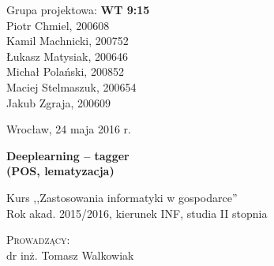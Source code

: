 \noindent
\begin{minipage}[t]{.5\linewidth}
	\begin{flushleft}
		Grupa projektowa: \textbf{WT 9:15}\\
		\vspace{0.8cm}
		Piotr Chmiel, 200608\\
		Kamil Machnicki, 200752\\
		Łukasz Matysiak, 200646\\
		Michał Polański, 200852\\
		Maciej Stelmaszuk, 200654\\
		Jakub Zgraja, 200609\\
	\end{flushleft} 
\end{minipage}%
\begin{minipage}[t]{.5\linewidth}
	\begin{flushright}
		Wrocław, 24 maja 2016 r.\\
		\vspace{.35cm}

	\end{flushright}
\end{minipage}

\vspace{3.0cm}

\begin{center}
	{\Huge\bf Deeplearning -- tagger}\\
	{\Large\bf (POS, lematyzacja)}\\
		
\end{center}

\begin{center}
	{\large Kurs ,,Zastosowania informatyki w gospodarce''}\\
	{\large Rok akad. 2015/2016, kierunek INF, studia II stopnia}
\end{center}

\vspace{2cm}
\begin{center}
		\textsc{Prowadzący:}\\
		dr inż. Tomasz Walkowiak
\end{center}

